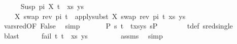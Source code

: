 \begin{isabellebody}
\ \ \ \ \isamarkupfalse%
\ {\isachardoublequoteopen}{\isacharparenleft}{\kern0pt}{\isacharparenleft}{\kern0pt}Susp\ pi\ X{\isacharcomma}{\kern0pt}\ t{}{\isacharparenright}{\kern0pt}\ {\isacharhash}{\kern0pt}\ xs{\isacharcomma}{\kern0pt}\ ys{\isacharparenright}{\kern0pt}\ {\isasymturnstile}\ \isanewline
\ \ \ \ {\isacharbrackleft}{\kern0pt}{\isacharparenleft}{\kern0pt}X{\isacharcomma}{\kern0pt}\ swap\ {\isacharparenleft}{\kern0pt}rev\ pi{\isacharparenright}{\kern0pt}\ t{}{\isacharparenright}{\kern0pt}{\isacharbrackright}{\kern0pt}\ {\isasymleadsto}\ apply{\isacharunderscore}{\kern0pt}subst\ {\isacharbrackleft}{\kern0pt}{\isacharparenleft}{\kern0pt}X{\isacharcomma}{\kern0pt}\ swap\ {\isacharparenleft}{\kern0pt}rev\ pi{\isacharparenright}{\kern0pt}\ t{}{\isacharparenright}{\kern0pt}{\isacharbrackright}{\kern0pt}\ {\isacharparenleft}{\kern0pt}xs{\isacharcomma}{\kern0pt}\ ys{\isacharparenright}{\kern0pt}{\isachardoublequoteclose}\isanewline
\ \ \ \ \ \ \isamarkupfalse%
\ var{\isacharunderscore}{\kern0pt}{}{\isacharunderscore}{\kern0pt}sred{\isacharbrackleft}{\kern0pt}OF\ False{\isacharbrackright}{\kern0pt}\ \isamarkupfalse%
\ simp\isanewline
\ \ \ \ \isamarkupfalse%
\ {\isachardoublequoteopen}{\isasymexists}\ P{}\ s{\isachardot}{\kern0pt}\ {\isacharparenleft}{\kern0pt}{\isacharparenleft}{\kern0pt}t{}\ {\isasymapprox}{\isacharquery}{\kern0pt}\ t{}{\isacharparenright}{\kern0pt}{\isacharhash}{\kern0pt}xs{\isacharcomma}{\kern0pt}ys{\isacharparenright}{\kern0pt}\ {\isasymTurnstile}{\isacharparenleft}{\kern0pt}{\isacharbraceleft}{\kern0pt}{\isacharbraceright}{\kern0pt}{\isacharcomma}{\kern0pt}s{\isacharparenright}{\kern0pt}{\isasymRightarrow}P{}{\isachardoublequoteclose}\isanewline
\ \ \ \ \ \ \isamarkupfalse%
\ t{}{\isacharunderscore}{\kern0pt}def\ sred{\isacharunderscore}{\kern0pt}single\ \isamarkupfalse%
\ blast\isanewline
\ \ \ \ \isamarkupfalse%
\ {\isachardoublequoteopen}fail\ {\isacharparenleft}{\kern0pt}{\isacharparenleft}{\kern0pt}t{}{\isacharcomma}{\kern0pt}\ t{}{\isacharparenright}{\kern0pt}\ {\isacharhash}{\kern0pt}\ xs{\isacharcomma}{\kern0pt}\ ys{\isacharparenright}{\kern0pt}{\isachardoublequoteclose}\ \isanewline
\ \ \ \ \ \ \isamarkupfalse%
\ assms\ \isamarkupfalse%
\ simp\isanewline
\ \ \isamarkupfalse%
\isanewline
{}\isamarkupfalse%

\end{isabellebody}
